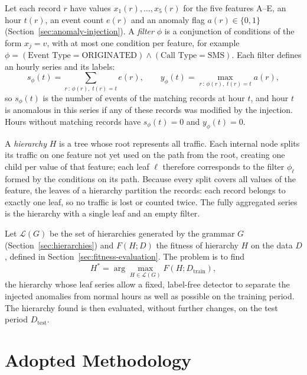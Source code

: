 Let each record $r$ have values $x_1(r), \dots, x_5(r)$ for the five features A--E, an hour $t(r)$, an event count $e(r)$ and an anomaly flag $a(r) \in \{0,1\}$ (Section~\ref{sec:anomaly-injection}).
A \emph{filter} $\phi$ is a conjunction of conditions of the form $x_j = v$, with at most one condition per feature, for example $\phi = (\text{Event Type} = \text{ORIGINATED}) \land (\text{Call Type} = \text{SMS})$.
Each filter defines an hourly series and its labels:
\begin{equation}
    s_\phi(t) = \sum_{r \,:\, \phi(r),\; t(r) = t} e(r),
    \qquad
    y_\phi(t) = \max_{r \,:\, \phi(r),\; t(r) = t} a(r),
    \label{eq:leaf-series}
\end{equation}
so $s_\phi(t)$ is the number of events of the matching records at hour $t$, and hour $t$ is anomalous in this series if any of these records was modified by the injection.
Hours without matching records have $s_\phi(t) = 0$ and $y_\phi(t) = 0$.

A \emph{hierarchy} $H$ is a tree whose root represents all traffic.
Each internal node splits its traffic on one feature not yet used on the path from the root, creating one child per value of that feature; each leaf $\ell$ therefore corresponds to the filter $\phi_\ell$ formed by the conditions on its path.
Because every split covers all values of the feature, the leaves of a hierarchy partition the records: each record belongs to exactly one leaf, so no traffic is lost or counted twice.
The fully aggregated series is the hierarchy with a single leaf and an empty filter.

Let $\mathcal{L}(G)$ be the set of hierarchies generated by the grammar $G$ (Section~\ref{sec:hierarchies}) and $F(H; D)$ the fitness of hierarchy $H$ on the data $D$, defined in Section~\ref{sec:fitness-evaluation}.
The problem is to find
\begin{equation}
    H^{*} = \arg\max_{H \in \mathcal{L}(G)} F(H; D_{\text{train}}),
    \label{eq:problem}
\end{equation}
the hierarchy whose leaf series allow a fixed, label-free detector to separate the injected anomalies from normal hours as well as possible on the training period.
The hierarchy found is then evaluated, without further changes, on the test period $D_{\text{test}}$.

\section{Adopted Methodology}
\label{sec:adopted-methodology}

